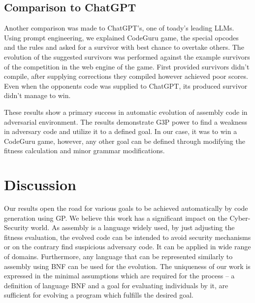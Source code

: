 \documentclass[dvipsnames,format=sigconf,anonymous=true,review=true]{acmart}
\begin{document}
\subsection{Comparison to ChatGPT}
Another comparison was made to ChatGPT's, one of toady's leading LLMs. Using prompt engineering, we explained CodeGuru game, the special opcodes and the rules and asked for a survivor with best chance to overtake others. The evolution of the suggested survivors was performed against the example survivors of the competition in the web engine of the game. First provided survivors didn't compile, after supplying corrections they compiled however achieved poor scores. Even when the opponents code was supplied to ChatGPT, its produced survivor didn't manage to win.

These results show a primary success in automatic evolution of assembly code in adversarial environment. The results demonstrate G3P power to find a weakness in adversary code and utilize it to a defined goal. In our case, it was to win a CodeGuru game, however, any other goal can be defined through modifying the fitness calculation and minor grammar modifications.


\section{Discussion}
Our results open the road for various goals to be achieved automatically by code generation using GP. We believe this work has a significant impact on the Cyber-Security world. As assembly is a language widely used, by just adjusting the fitness evaluation, the evolved code can be intended to avoid security mechanisms or on the contrary find suspicious adversary code. It can be applied in wide range of domains. Furthermore, any language that can be represented similarly to assembly using BNF can be used for the evolution. The uniqueness of our work is expressed in the minimal assumptions which are required for the process -- a definition of language BNF and a goal for evaluating individuals by it, are sufficient for evolving a program which fulfills the desired goal. 


  
\end{document}
